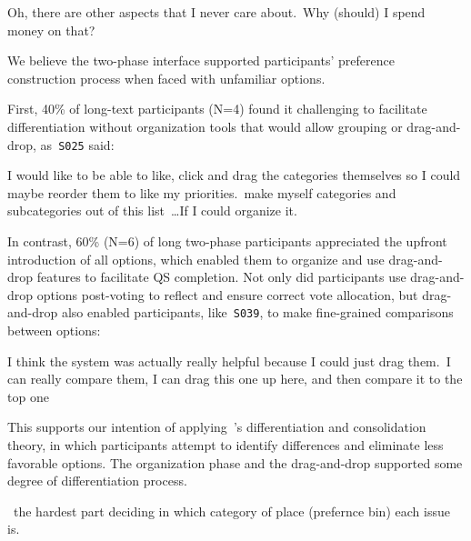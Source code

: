 \begin{displayquote}
Oh, there are other aspects that I never care about.~\bracketellipsis Why (should) I spend money on that? \hfill{}
\end{displayquote}

We believe the two-phase interface supported participants' preference construction process when faced with unfamiliar options.

First, 40\% of long-text participants (N=4) found it challenging to facilitate differentiation without organization tools that would allow grouping or drag-and-drop, as~\texttt{S025} said:

\begin{displayquote}
    I would like to be able to like, click and drag the categories themselves so I could maybe reorder them to like my priorities.~\bracketellipsis make myself categories and subcategories out of this list~\ldots If I could organize it. \hfill{}
\end{displayquote}

In contrast, 60\% (N=6) of long two-phase participants appreciated the upfront introduction of all options, which enabled them to organize and use drag-and-drop features to facilitate QS completion. Not only did participants use drag-and-drop options post-voting to reflect and ensure correct vote allocation, but drag-and-drop also enabled participants, like~\texttt{S039}, to make fine-grained comparisons between options:

\begin{displayquote}  
    I think the system was actually really helpful because I could just drag them.~\bracketellipsis I can really compare them, I can drag this one up here, and then compare it to the top one~\bracketellipsis \hfill{}  
\end{displayquote}  

This supports our intention of applying~\citet{svensonDifferentiationConsolidationTheory1992}'s differentiation and consolidation theory, in which participants attempt to identify differences and eliminate less favorable options. The organization phase and the drag-and-drop supported some degree of differentiation process.

\begin{displayquote}
    ~\bracketellipsis the hardest part deciding in which category of place (prefernce bin) each issue is. \hfill{}
\end{displayquote}

